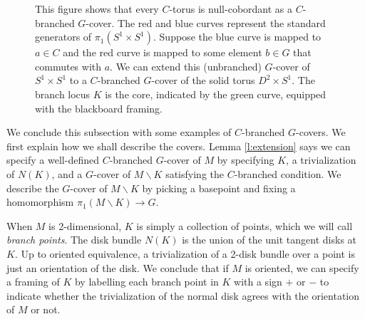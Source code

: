 \documentclass[10pt,twocolumn,amsmath,amssymb,aps,pra,secnumarabic,
    nofootinbib,groupedaddress]{revtex4-1}
\renewcommand{\setminus}{\smallsetminus}
\begin{document}
\begin{figure}
\caption{This figure shows that every $C$-torus is null-cobordant as a $C$-branched $G$-cover. The red and blue curves represent the standard generators of $\pi_1(S^1 \times S^1)$.  Suppose the blue curve is mapped to $a \in C$ and the red curve is mapped to some element $b \in G$ that commutes with $a$.  We can extend this (unbranched) $G$-cover of $S^1 \times S^1$ to a $C$-branched $G$-cover of the solid torus $D^2 \times S^1$.  The branch locus $K$ is the core, indicated by the green curve, equipped with the blackboard framing.}
\label{f:torus}
\end{figure}

We conclude this subsection with some examples of $C$-branched $G$-covers.  We first explain how we shall describe the covers.  Lemma \ref{l:extension} says we can specify a well-defined $C$-branched $G$-cover of $M$ by specifying $K$, a trivialization of $N(K)$, and a $G$-cover of $M \setminus K$ satisfying the $C$-branched condition.  We describe the $G$-cover of $M \setminus K$ by picking a basepoint and fixing a homomorphism $\pi_1(M \setminus K) \to G$.

When $M$ is 2-dimensional, $K$ is simply a collection of points, which we will call \emph{branch points}.  The disk bundle $N(K)$ is the union of the unit tangent disks at $K$.  Up to oriented equivalence, a trivialization of a 2-disk bundle over a point is just an orientation of the disk.  We conclude that if $M$ is oriented, we can specify a framing of $K$ by labelling each branch point in $K$ with a sign $+$ or $-$ to indicate whether the trivialization of the normal disk agrees with the orientation of $M$ or not.
\end{document}
